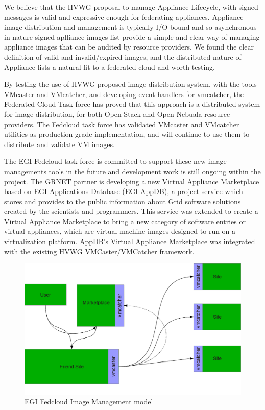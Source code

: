 \documentclass{cai}
\begin{document}
We believe that the HVWG proposal to manage Appliance Lifecycle, with signed messages is valid and expressive enough for federating appliances. 
Appliance image distribution and management is typically I/O bound and so asynchronous in nature signed aplliance images list provide a simple and clear way of managing appliance images that can be audited by resource providers. 
We found the clear definition of valid and invalid/expired images, and the distributed nature of Appliance lists a natural fit to a federated cloud and worth testing.

By testing the use of HVWG proposed image distribution system, with the tools VMcaster and VMcatcher, and developing event handlers for vmcatcher, the Federated Cloud Task force has proved that this approach is a distributed system for image distribution, for both Open Stack and Open Nebuala resource providers. 
The Fedcloud task force has validated VMcaster and VMcatcher utilities as production grade implementation, and will continue to use them to distribute and validate VM images.

The EGI Fedcloud task force is committed to support these new image managements tools in the future and development work is still ongoing within the project. 
The GRNET partner is developing a new Virtual Appliance Marketplace based on EGI Applications Database (EGI AppDB), a project service which stores and provides to the public information about Grid software solutions created by the scientists and programmers.
This service was extended to create a Virtual Appliance Marketplace to bring a new category of software entries or virtual appliances, which are virtual machine images designed to run on a virtualization platform.
AppDB's Virtual Appliance Marketplace was integrated with the existing HVWG VMCaster/VMCatcher framework.

\begin{figure}
\centering
\includegraphics[width=1\textwidth]{egi_model.png}
\caption{EGI Fedcloud Image Management model}
\label{fig:egimodel}
\end{figure}
\end{document}
